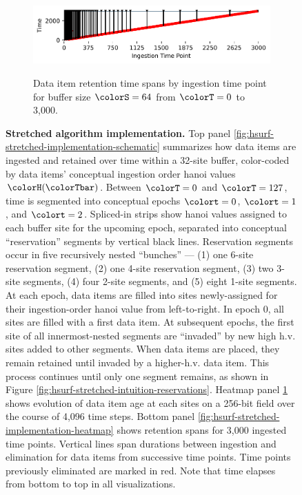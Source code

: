 \begin{figure}[h!]
   \begin{minipage}[]{\textwidth}
   \vspace{-2pt}
  \begin{subfigure}[t]{0.7\linewidth}
  \vspace{0pt}
    \centering
    \includegraphics[width=0.88\linewidth,clip]{binder/teeplots/40/num-generations=4096+surface-size=64+viz=stratum-persistence-dripplot+ext=}
  \end{subfigure}%
  \begin{subfigure}[t]{0.3\linewidth}
  \vspace{-2pt}
  \caption{%
    Data item retention time spans by ingestion time point for buffer size $\colorS=64$ from $\colorT=0$ to 3,000.
  }
  \label{fig:hsurf-stretched-implementation-dripplot}
  \end{subfigure}
  \end{minipage}

\vspace{-2ex}\caption{%
  \textbf{Stretched algorithm implementation.}
  \footnotesize
  Top panel \ref{fig:hsurf-stretched-implementation-schematic} summarizes how data items are ingested and retained over time within a 32-site buffer, color-coded by data items' conceptual ingestion order hanoi values $\colorH(\colorTbar)$.
  Between $\colorT=0$ and $\colorT=127$, time is segmented into conceptual epochs $\colort=0$, $\colort=1$, and $\colort=2$.
  Spliced-in strips show hanoi values assigned to each buffer site for the upcoming epoch, separated into conceptual ``reservation'' segments by vertical black lines.
  Reservation segments occur in five recursively nested ``bunches'' --- (1) one 6-site reservation segment, (2) one 4-site reservation segment, (3) two 3-site segments, (4) four 2-site segments, and (5) eight 1-site segments.
  At each epoch, data items are filled into sites newly-assigned for their ingestion-order hanoi value from left-to-right.
  In epoch 0, all sites are filled with a first data item.
  At subsequent epochs, the first site of all innermost-nested segments are ``invaded'' by new high h.v. sites added to other segments.
  When data items are placed, they remain retained until invaded by a higher-h.v. data item.
  This process continues until only one segment remains, as shown in Figure \ref{fig:hsurf-stretched-intuition-reservations}.
  Heatmap panel \ref{fig:hsurf-stretched-implementation-dripplot} shows evolution of data item age at each sites on a 256-bit field over the course of 4,096 time steps.
  Bottom panel \ref{fig:hsurf-stretched-implementation-heatmap} shows retention spans for 3,000 ingested time points.
  Vertical lines span durations between ingestion and elimination for data items from successive time points.
  Time points previously eliminated are marked in red.
  Note that time elapses from bottom to top in all visualizations.
  }
\label{fig:hsurf-stretched-implementation}

\end{figure}
